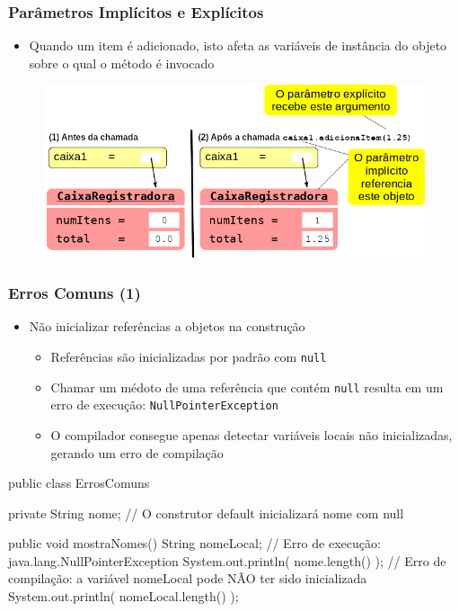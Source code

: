 \documentclass[xcolor={dvipsnames,table},aspectratio=169]{beamer}
\begin{document}
\begin{frame}\frametitle{Parâmetros Implícitos e Explícitos}
\begin{itemize}
	\item Quando um item é adicionado, isto afeta as variáveis de instância do objeto sobre o qual o método é invocado
\end{itemize}
\begin{figure}[h]
	\includegraphics[height=0.60\paperheight,center]{pucrs-ep-fprog-unidade_07-objetos_e_classes-laminas-antes_e_depois_de_uma_chamada.png}
\end{figure}
\end{frame}

\begin{frame}[fragile]\frametitle{Erros Comuns (1)}
\begin{itemize}
	\item Não inicializar referências a objetos na construção
	\begin{itemize}
		\item Referências são inicializadas por padrão com \texttt{null}
		\item Chamar um médoto de uma referência que contém \texttt{null} resulta em um erro de execução: \texttt{NullPointerException}
		\item O compilador consegue apenas detectar variáveis locais não inicializadas, gerando um erro de compilação
	\end{itemize}
\end{itemize}
{\scriptsize
\begin{javacode}
public class ErrosComuns {
  private String nome;  // O construtor default inicializará nome com null

  public void mostraNomes() {
    String nomeLocal;
    // Erro de execução: java.lang.NullPointerException
    System.out.println( nome.length() );
    // Erro de compilação: a variável nomeLocal pode NÃO ter sido inicializada
    System.out.println( nomeLocal.length() );
  }
}
\end{javacode}
}
\end{frame}
\end{document}

